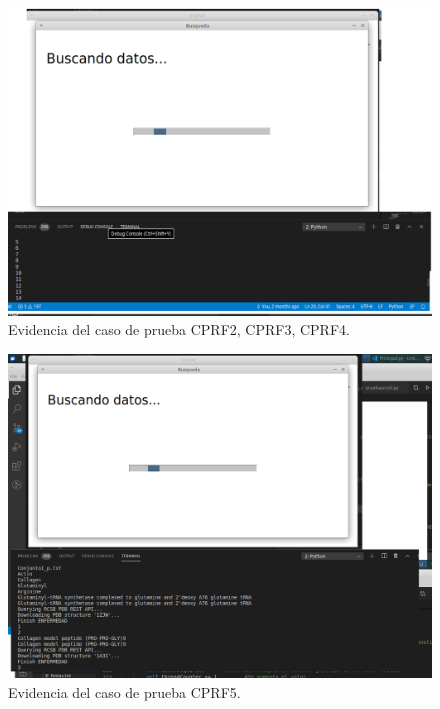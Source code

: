 \begin{figure}[H]
    \centering
    \includegraphics[scale=0.45]{Anexo/imagenes/Imagenes_Pruebas/CPRF234.png}
    \caption{Evidencia del caso de prueba CPRF2, CPRF3, CPRF4.}
    \label{CPRF2-3-4}
\end{figure}

\begin{figure}[H]
    \centering
    \includegraphics[scale=0.45]{Anexo/imagenes/Imagenes_Pruebas/CPRF5.png}
    \caption{Evidencia del caso de prueba CPRF5.}
    \label{CPRF5}
\end{figure}

